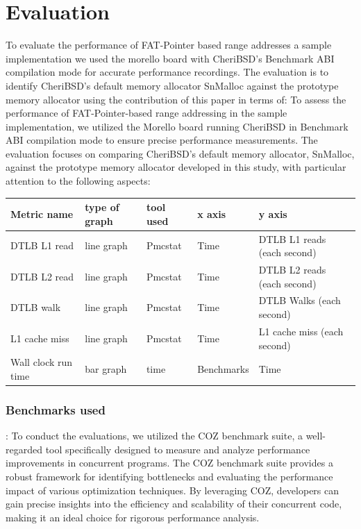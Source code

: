 \chapter{Evaluation}\label{chap:evaluation}
\ifpdf
    \graphicspath{{Evaluation/Figs/Raster/}{Evaluation/Figs/PDF/}{Evaluation/Figs/}}
\else
    \graphicspath{{Evaluation/Figs/Vector/}{Evaluation/Figs/}}
\fi

To evaluate the performance of FAT-Pointer based range addresses a sample implementation we used
the morello board with CheriBSD's Benchmark ABI\cite{noauthor_benchmark_nodate} compilation mode for accurate performance recordings. 
The evaluation is to identify CheriBSD's default memory allocator SnMalloc against the prototype memory 
allocator using the contribution of this paper in terms of: 
To assess the performance of FAT-Pointer-based range addressing in the sample implementation, we utilized the 
Morello board running CheriBSD in Benchmark ABI compilation mode to ensure precise performance measurements. 
The evaluation focuses on comparing CheriBSD's default memory allocator, SnMalloc, against the prototype 
memory allocator developed in this study, with particular attention to the following aspects:

\begin{table}[!ht]
  \centering
  \begin{tabular}{|l|l|l|l|l|}
  \hline
      Metric name & type of graph & tool used & x axis & y axis \\ \hline
      DTLB L1 read & line graph & Pmcstat & Time & DTLB L1 reads (each second) \\ \hline
      DTLB L2 read & line graph & Pmcstat & Time & DTLB L2 reads (each second) \\ \hline
      DTLB walk & line graph & Pmcstat & Time & DTLB Walks (each second) \\ \hline
      L1 cache miss & line graph & Pmcstat & Time & L1 cache miss (each second) \\ \hline
      Wall clock run time & bar graph & time & Benchmarks & Time \\ \hline
  \end{tabular}
\end{table}

\subsection{Benchmarks used}:
To conduct the evaluations, we utilized the COZ\cite{curtsinger_coz_2015} benchmark suite, a well-regarded tool specifically designed 
to measure and analyze performance improvements in concurrent programs. The COZ benchmark suite provides a
robust framework for identifying bottlenecks and evaluating the performance impact of various optimization
techniques. By leveraging COZ, developers can gain precise insights into the efficiency and scalability of
their concurrent code, making it an ideal choice for rigorous performance analysis.

